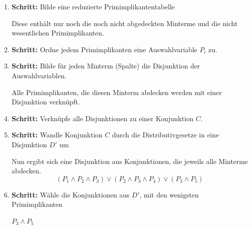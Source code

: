 \documentclass[12pt]{report}
\begin{document}
\begin{enumerate}
  \item \textbf{Schritt:} Bilde eine reduzierte Primimplikantentabelle
        
        Diese enthält nur noch die noch nicht abgedeckten Minterme und die nicht wesentlichen Primimplikanten.
        
  \item \textbf{Schritt:} Ordne jedem Primimplikanten eine Auswahlvariable $P_i$ zu.
        
  \item \textbf{Schritt:} Bilde für jeden Minterm (Spalte) die Disjunktion der Auswahlvariablen.
        
        Alle Primimplikanten, die diesen Minterm abdecken werden mit einer Disjunktion verknüpft.
        
  \item \textbf{Schritt:} Verknüpfe alle Disjunktionen zu einer Konjunktion $C$.
        
  \item \textbf{Schritt:} Wandle Konjunktion $C$ durch die Distributivgesetze in eine Disjunktion $D'$ um
        
        Nun ergibt sich eine Disjunktion aus Konjunktionen, die jeweils alle Minterme abdecken.
        $$(P_1 \wedge P_2 \wedge P_3) \vee (P_2 \wedge P_3 \wedge P_4) \vee (P_3 \wedge P_5)$$
        
  \item \textbf{Schritt:} Wähle die Konjunktionen aus $D'$, mit den wenigsten Primimplikanten
        
        $P_3 \wedge P_5$
        
\end{enumerate}
\end{document}

